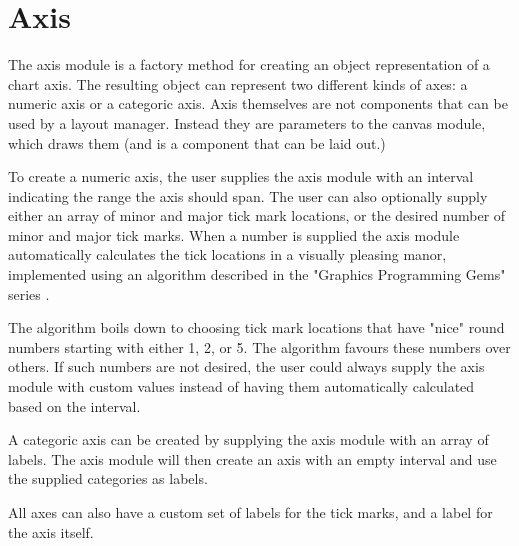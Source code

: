 \section{Axis}
The axis module is a factory method for creating an object representation of a chart axis. The resulting object can represent two different kinds of axes: a numeric axis or a categoric axis. Axis themselves are not components that can be used by a layout manager. Instead they are parameters to the canvas module, which draws them (and is a component that can be laid out.) 

To create a numeric axis, the user supplies the axis module with an interval indicating the range the axis should span. The user can also optionally supply either an array of minor and major tick mark locations, or the desired number of minor and major tick marks.  When a number is supplied the axis module automatically calculates the tick locations in a visually pleasing manor, implemented using an algorithm described in the "Graphics Programming Gems" series \cite{heckbert90}. 

The algorithm boils down to choosing tick mark locations that have "nice" round numbers starting with either 1, 2, or 5. The algorithm favours these numbers over others. If such numbers are not desired, the user could always supply the axis module with custom values instead of having them automatically calculated based on the interval.

A categoric axis can be created by supplying the axis module with an array of labels. The axis module will then create an axis with an empty interval and use the supplied categories as labels.

All axes can also have a custom set of labels for the tick marks, and a label for the axis itself.
